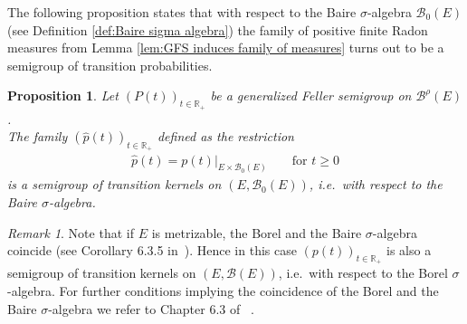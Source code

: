 \documentclass[a4paper,12pt]{article}
\newtheorem{proposition}[theorem]{Proposition}
\theoremstyle{definition}
\theoremstyle{remark}
\newtheorem{remark}[theorem]{Remark}
\numberwithin{equation}{section}
\numberwithin{theorem}{section}
\begin{document}
The following proposition states that
with respect to the Baire $\sigma$-algebra $\mathcal{B}_{0}(E)$
(see Definition \ref{def:Baire sigma algebra})
the family of positive finite Radon measures from Lemma \ref{lem:GFS induces family of measures} turns out to be  a semigroup
of transition probabilities.




\begin{proposition}


\label{prop:GFS implies existence of semigroup of transition kernels} Let
$\left(P(t)\right)_{t\in\mathbb{R}_{+}}$ be a generalized Feller
semigroup on $\mathcal{\mathscr{B}}^{\rho}(E)$. \\
The family $\left(\hat{p}(t)\right)_{t\in\mathbb{R}_{+}}$ defined
as the restriction 
\begin{eqnarray*}
\hat{p}(t)=\left.p(t)\right|_{E\times\mathcal{B}_{0}(E)} & & \text{ for } t\geq 0
\end{eqnarray*}
is a semigroup of transition kernels
on $(E, \mathcal{B}_{0}(E))$, i.e.~with respect to the Baire $\sigma$-algebra.
\end{proposition}

\begin{remark}\label{rem:BaireBorel}
Note that if $E$ is metrizable,  the Borel and the Baire $\sigma$-algebra coincide (see Corollary 6.3.5 in~\cite{Bogachev2007}). Hence in this case 
$\left(p(t)\right)_{t\in\mathbb{R}_{+}}$ is also a semigroup of transition
kernels on $(E, \mathcal{B}(E))$, i.e.~with respect to the Borel $\sigma$-algebra. For further conditions implying the coincidence of the Borel and the Baire $\sigma$-algebra we refer to Chapter 6.3 of ~\cite{Bogachev2007}.
\end{remark}
\end{document}
